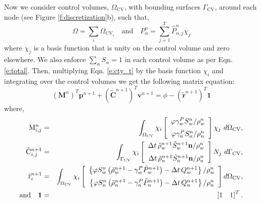 Now we consider control volumes, $\Omega_\mathrm{CV}$, with bounding surfaces $\Gamma_\mathrm{CV}$, around each node (see Figure \ref{f:discretization}b), such that,
\begin{equation}
\Omega = \sum_i \Omega_{\mathrm{CV}_i}\quad \mathrm{and} \quad P^n_\alpha = \sum_{j=1}^\mathcal{X} \hat{P}^n_{\alpha,j} \chi_j
\end{equation}
where $\chi_j$ is a basis function that is unity on the control volume and zero elsewhere.  We also enforce $\sum_\alpha S_\alpha = 1$ in each control volume as per Eqn. \ref{e:total}.  Then, multiplying Eqn. \ref{e:cty_t} by the basis function $\chi_i$ and integrating over the control volumes we get the following matrix equation:
\begin{equation}\label{e:cty_matrix}
(\mathbf{M}^n)^T \mathbf{p}^{n+1} + (\tilde{\mathbf{C}}^{n+1})^T \mathbf{v}^{n+1} = \phi - (\tilde{\mathbf{r}}^{n+1})^T \mathbf{1}
\end{equation}
where,
\begin{eqnarray}
\mathrm{M}^n_{i,j} & = & \int_{\Omega_\mathrm{CV}} \chi_i \left[ \begin{array}{c}
\phi \gamma_w^P S^n_w / \rho^n_w \vspace*{2mm}\\
\phi \gamma_n^P S^n_n / \rho^n_n
\end{array} \right] \chi_j\ d\Omega_\mathrm{CV},\\
\tilde{\mathrm{C}}^{n+1}_{i,j} & = & \int_{\Gamma_\mathrm{CV}} \chi_i \left[ \begin{array}{c}
\Delta t\, \tilde{\rho}_w^{n+1} \tilde{S}_w^{n+1} \mathbf{n} / \rho^n_w \vspace*{2mm}\\
\Delta t\, \tilde{\rho}_n^{n+1} \tilde{S}_n^{n+1} \mathbf{n} / \rho^n_n
\end{array} \right] N_j\ d\Gamma_\mathrm{CV},\\
\tilde{\mathrm{r}}^{n+1}_i & = & \int_{\Omega_\mathrm{CV}} \chi_i \left[ \begin{array}{c}
\left\{ \phi S^n_w \left( \tilde{\rho}^{n+1}_w - \gamma^P_w \tilde{P}^{n+1}_w \right) - \Delta t\, Q^{n+1}_w \right\} / \rho^n_w \vspace*{2mm}\\
\left\{ \phi S^n_n \left( \tilde{\rho}^{n+1}_n - \gamma^P_n \tilde{P}^{n+1}_n \right) - \Delta t\, Q^{n+1}_n \right\} / \rho^n_n
\end{array} \right] d\Omega_\mathrm{CV},\\
\mathrm{and} \quad \mathbf{1} & = & \left[ 1\quad 1 \right]^T.
\end{eqnarray}


